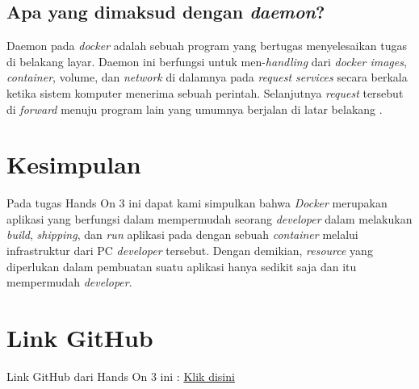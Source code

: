 \documentclass[11pt,a4paper]{article}
\begin{document}
\subsection{Apa yang dimaksud dengan \textit{daemon}?}
    Daemon pada \textit{docker} adalah sebuah program yang bertugas menyelesaikan tugas di belakang layar. Daemon ini berfungsi untuk men-\textit{handling} dari \textit{docker images}, \textit{container},
    volume, dan \textit{network} di dalamnya pada \textit{request services} secara berkala ketika sistem komputer menerima sebuah perintah. Selanjutnya \textit{request} tersebut di \textit{forward} menuju 
    program lain yang umumnya berjalan di latar belakang \cite{contributor_2005}.

\newpage
\section{Kesimpulan}
    Pada tugas Hands On 3 ini dapat kami simpulkan bahwa \textit{Docker} merupakan aplikasi yang berfungsi dalam mempermudah seorang \textit{developer} dalam melakukan 
    \textit{build}, \textit{shipping}, dan \textit{run} aplikasi pada dengan sebuah \textit{container} melalui infrastruktur dari PC \textit{developer} tersebut. 
    Dengan demikian, \textit{resource} yang diperlukan dalam pembuatan suatu aplikasi hanya sedikit saja dan itu mempermudah \textit{developer}. 

		

\section{Link GitHub}
	Link GitHub dari Hands On 3 ini : \href{https://github.com/BilhaqAD07/Sistem-Operasi.git}{Klik disini}


\newpage


\end{document}
